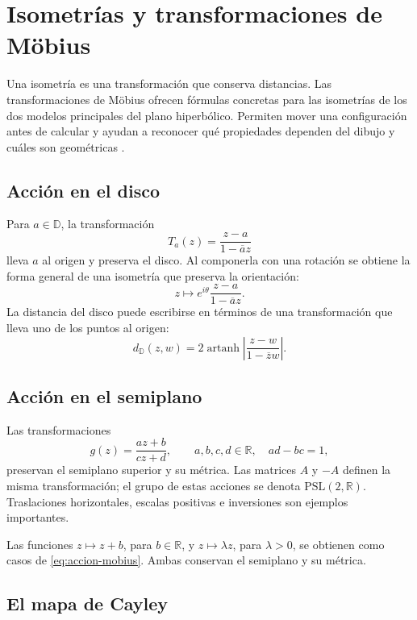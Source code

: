 \chapter{Isometrías y transformaciones de Möbius}
\label{cap:isometrias}

Una isometría es una transformación que conserva distancias. Las transformaciones de Möbius ofrecen fórmulas concretas para las isometrías de los dos modelos principales del plano hiperbólico. Permiten mover una configuración antes de calcular y ayudan a reconocer qué propiedades dependen del dibujo y cuáles son geométricas \cite{anderson2005,beardon1983}.

\section{Acción en el disco}

Para \(a\in\mathbb D\), la transformación
\[
  T_a(z)=\frac{z-a}{1-\overline a z}
\]
lleva \(a\) al origen y preserva el disco. Al componerla con una rotación se obtiene la forma general de una isometría que preserva la orientación:
\[
  z\longmapsto e^{i\theta}\frac{z-a}{1-\overline a z}.
\]
La distancia del disco puede escribirse en términos de una transformación que lleva uno de los puntos al origen:
\[
  d_{\mathbb D}(z,w)=2\operatorname{artanh}\left|
  \frac{z-w}{1-\overline z w}\right|.
\]

\section{Acción en el semiplano}

Las transformaciones
\begin{equation}
  g(z)=\frac{az+b}{cz+d},\qquad a,b,c,d\in\mathbb R,\quad ad-bc=1,
  \label{eq:accion-mobius}
\end{equation}
preservan el semiplano superior y su métrica. Las matrices \(A\) y \(-A\) definen la misma transformación; el grupo de estas acciones se denota \(\mathrm{PSL}(2,\mathbb R)\). Traslaciones horizontales, escalas positivas e inversiones son ejemplos importantes.

\begin{example}
Las funciones \(z\mapsto z+b\), para \(b\in\mathbb R\), y \(z\mapsto \lambda z\), para \(\lambda>0\), se obtienen como casos de \cref{eq:accion-mobius}. Ambas conservan el semiplano y su métrica.
\end{example}

\section{El mapa de Cayley}

